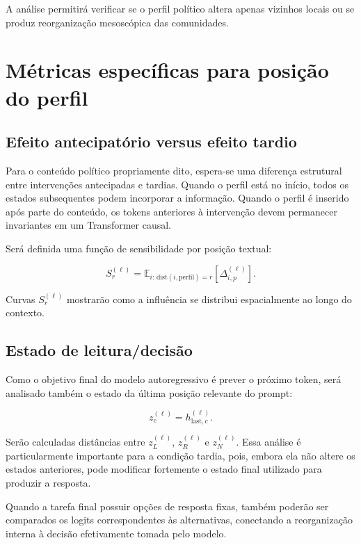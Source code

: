 \documentclass[11pt,a4paper]{article}
\begin{document}
A análise permitirá verificar se o perfil político altera apenas vizinhos locais ou se produz reorganização mesoscópica das comunidades.

\section{Métricas específicas para posição do perfil}

\subsection{Efeito antecipatório versus efeito tardio}

Para o conteúdo político propriamente dito, espera-se uma diferença estrutural entre intervenções antecipadas e tardias. Quando o perfil está no início, todos os estados subsequentes podem incorporar a informação. Quando o perfil é inserido após parte do conteúdo, os tokens anteriores à intervenção devem permanecer invariantes em um Transformer causal.

Será definida uma função de sensibilidade por posição textual:

\[
S_r^{(\ell)}
=
\mathbb{E}_{i:\,\text{dist}(i,\text{perfil})=r}
\left[
\Delta_{i,p}^{(\ell)}
\right].
\]

Curvas $S_r^{(\ell)}$ mostrarão como a influência se distribui espacialmente ao longo do contexto.

\subsection{Estado de leitura/decisão}

Como o objetivo final do modelo autoregressivo é prever o próximo token, será analisado também o estado da última posição relevante do prompt:

\[
z_c^{(\ell)} = h_{\mathrm{last},c}^{(\ell)}.
\]

Serão calculadas distâncias entre $z_L^{(\ell)}$, $z_R^{(\ell)}$ e $z_N^{(\ell)}$. Essa análise é particularmente importante para a condição tardia, pois, embora ela não altere os estados anteriores, pode modificar fortemente o estado final utilizado para produzir a resposta.

Quando a tarefa final possuir opções de resposta fixas, também poderão ser comparados os logits correspondentes às alternativas, conectando a reorganização interna à decisão efetivamente tomada pelo modelo.
\end{document}
